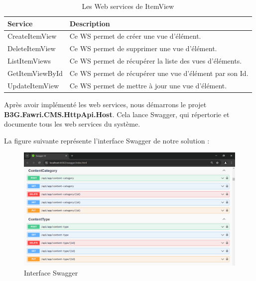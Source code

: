 \begin{table}[H]
    \centering
    \begin{tabular}{|m{5cm}|m{10cm}|}
        \hline
        \textbf{Service} & \textbf{Description}                                    \\
        \hline
        CreateItemView   & Ce WS permet de créer une vue d'élément.                \\
        \hline

        DeleteItemView   & Ce WS permet de supprimer une vue d'élément.            \\
        \hline

        ListItemViews    & Ce WS permet de récupérer la liste des vues d'éléments. \\
        \hline

        GetItemViewById  & Ce WS permet de récupérer une vue d'élément par son Id. \\
        \hline

        UpdateItemView   & Ce WS permet de mettre à jour une vue d'élément.        \\

        \hline
    \end{tabular}
    \caption{Les Web services de ItemView}
    \label{tab:my_label}
\end{table}



Après avoir implémenté les web services, nous démarrons le projet \textbf{B3G.Fawri.CMS.HttpApi.Host}. Cela lance Swagger, qui répertorie et documente tous les web services du système.

La figure suivante représente l’interface Swagger de notre solution :


\begin{figure}[H]
    \centering
    \includegraphics[width=18cm]{Figures/swagger apis.PNG}
    \caption{Interface Swagger}
\end{figure}


